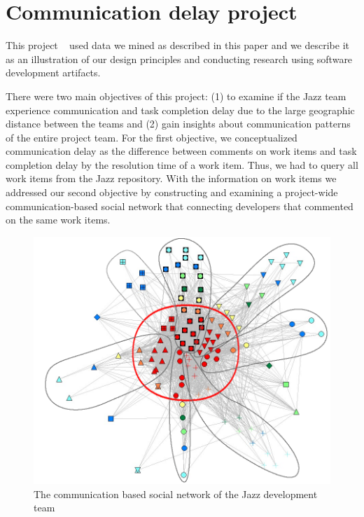 \section{Communication delay project}
This project ~\cite{Nguyen:2008:ICGSE} used data we mined as described in this
paper and we describe it as an illustration of our
design principles and conducting research using software development artifacts.

There were two main objectives of this project: (1) to examine if the Jazz team
experience communication and task completion delay due to the large geographic
distance between the teams and (2) gain insights about communication patterns of
the entire project team. For the first objective, we conceptualized communication
delay as the difference between comments on work items and task completion delay
by the resolution time of a work item. Thus, we had to query all work items from
the Jazz repository. With the information on work items we addressed our second
objective by constructing and examining a project-wide communication-based
social network that connecting developers that commented on the same work items.

\begin{figure}[t]
	\begin{center}
	\includegraphics[width=.99\columnwidth]{./Figures/Figure03SocialNetwork}
	\caption{The communication based social network of the Jazz development team}
	\label{fig:SocialNetwork}
	\end{center}
\end{figure}

